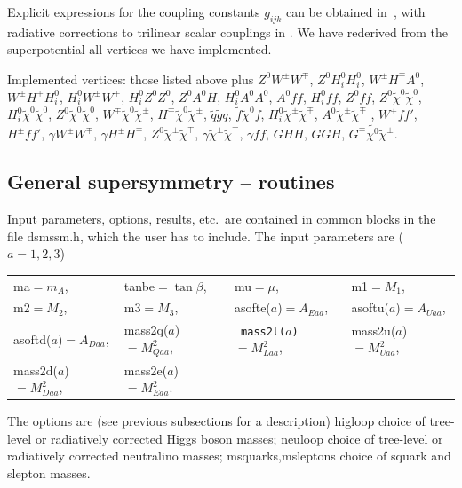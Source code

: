 \documentclass[a4paper,10pt,oneside]{book}
\newcommand{\joakim}[1]{{\color{red}\bf (JE: #1)}}
\newcommand{\ft}[1]{\textsf{#1}}
\begin{document}
Explicit expressions for the coupling constants $g_{ijk}$ can be obtained
in~\cite{Haber:1984rc,Gunion:1984yn,Haber:1988px}, with radiative corrections to trilinear scalar couplings in
\cite{haber97}. We have rederived from the superpotential all vertices we have
implemented.

Implemented vertices:  those listed above plus 
$Z^0W^\pm W^\mp $, $Z^0H^0_iH^0_i$, $W^\pm H^\mp A^0$,
$W^\pm H^\mp H^0_i$, $H^0_iW^\pm W^\mp $, $H^0_iZ^0Z^0$, $Z^0A^0H$,
$H^0_iA^0A^0$, $A^0ff$, $H^0_iff$, $Z^0ff$, $Z^0\tilde{\chi}^0\tilde{\chi}^0$,
$H^0_i\tilde{\chi}^0\tilde{\chi}^0$, $Z^0\tilde{\chi}^0\tilde{\chi}^0$,
$W^\mp\tilde{\chi}^0\tilde{\chi}^\pm$, $H^\mp\tilde{\chi}^0\tilde{\chi}^\pm$, $
\tilde{q}\tilde{g}q$, $\tilde{f}\tilde{\chi}^0 f$, $H^0_i\tilde{\chi}^\pm
\tilde{\chi}^\mp$, $A^0\tilde{\chi}^\pm \tilde{\chi}^\mp$ , $W^\pm f f'$,
$H^\pm f f'$, $\gamma W^\pm W^\mp$, $ \gamma H^\pm H^\mp$, $Z^0
\tilde{\chi}^\pm \tilde{\chi}^\mp$, $\gamma\tilde{\chi}^\pm \tilde{\chi}^\mp$,
$\gamma f f$, $GHH$, $GGH$, $G^\mp\tilde{\chi^0}\tilde{\chi}^\pm$.


\subsection{General supersymmetry -- routines}

Input parameters, options, results, etc.\ are contained in common blocks in the
file \ft{dsmssm.h}, which the user has to include. The input parameters
are ($a=1,2,3$) \newline\begin{tabular}{llll} \ft{ma}$=m_A$, & \ft{tanbe}$=\tan\beta$, & \ft{mu}$=\mu$, &
  \ft{m1}$=M_1$, \\
  \ft{m2}$=M_2$, & \ft{m3}$=M_3$, & \ft{asofte($a$)}$=A_{Eaa}$, &
  {asoftu($a$)}$=A_{Uaa}$, \\
  \ft{asoftd($a$)}$=A_{Daa}$, & \ft{mass2q($a$)}$=M^2_{Qaa}$, & {\tt
    mass2l($a$)}$=M^2_{Laa}$, &
  \ft{mass2u($a$)}$=M^2_{Uaa}$, \\
  \ft{mass2d($a$)}$=M^2_{Daa}$, &
  \ft{mass2e($a$)}$=M^2_{Eaa}$. & & \\
\end{tabular}\newline
The options are (see previous subsections for a description)
\newline
\ft{higloop} choice of tree-level or radiatively corrected Higgs boson
  masses; 
\newline 
\ft{neuloop} choice of tree-level or radiatively corrected neutralino
  masses; 
\newline
\ft{msquarks,msleptons} choice of squark and slepton masses.
\end{document}
